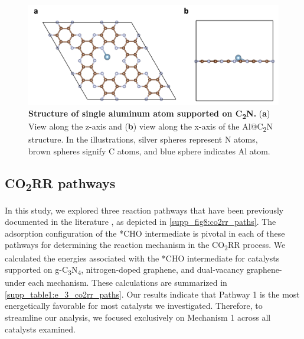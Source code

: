 \documentclass[a4paper, 12pt]{article}
\begin{document}
\begin{figure}[htbp]
  \centering
  \includegraphics[width=\textwidth]{supp_fig7_Al-C2N.png}
  \caption{\textbf{Structure of single aluminum atom supported on C\textsubscript{2}N.}
  (\textbf{a}) View along the z-axis and (\textbf{b}) view along the x-axis
  of the Al@C\textsubscript{2}N structure.
  In the illustrations, silver spheres represent N atoms, brown spheres
  signify C atoms, and blue sphere indicates Al atom.}
  \label{supp_fig7:Al-C2N}
\end{figure}

\subsection{CO\textsubscript{2}RR pathways}
\label{supp_sec2.2_co2rr_paths}

In this study, we explored three reaction pathways that have been previously documented in the literature \cite{durand2011structure, nie2014reaction, peterson2010copper}, as depicted in \cref{supp_fig8:co2rr_paths}.
The adsorption configuration of the *CHO intermediate is pivotal in each of these pathways for determining the reaction mechanism in the CO\textsubscript{2}RR process.
We calculated the energies associated with the *CHO intermediate for catalysts
supported on g-C\textsubscript{3}N\textsubscript{4}, nitrogen-doped graphene, and dual-vacancy graphene-under each mechanism.
These calculations are summarized in \cref{supp_table1:e_3_co2rr_paths}.
Our results indicate that Pathway 1 is the most energetically favorable for most catalysts we investigated.
Therefore, to streamline our analysis, we focused exclusively on Mechanism 1 across all catalysts examined.
\end{document}
